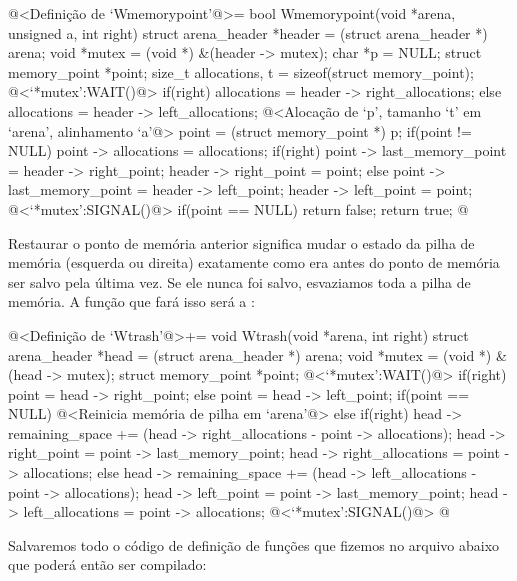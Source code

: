 \iniciocodigo
@<Definição de `Wmemorypoint'@>=
bool Wmemorypoint(void *arena, unsigned a, int right){
  struct arena_header *header = (struct arena_header *) arena;
  void *mutex = (void *) &(header -> mutex);
  char *p = NULL;
  struct memory_point *point;
  size_t allocations, t = sizeof(struct memory_point);
  @<`*mutex':WAIT()@>
  if(right)
    allocations = header -> right_allocations;
  else
    allocations = header -> left_allocations;
  @<Alocação de `p', tamanho `t' em `arena', alinhamento `a'@>
  point = (struct memory_point *) p;
  if(point != NULL){
    point -> allocations = allocations;
    if(right){
      point -> last_memory_point = header -> right_point;
      header -> right_point = point;
    }
    else{
      point -> last_memory_point = header -> left_point;
      header -> left_point = point;
    }
  }
  @<`*mutex':SIGNAL()@>
  if(point == NULL)
    return false;
  return true;
}
@
\fimcodigo


Restaurar o ponto de memória anterior significa mudar o estado da
pilha de memória (esquerda ou direita) exatamente como era antes do
ponto de memória ser salvo pela última vez. Se ele nunca foi salvo,
esvaziamos toda a pilha de memória. A função que fará isso será
a :

\iniciocodigo
@<Definição de `Wtrash'@>+=
void Wtrash(void *arena, int right){
  struct arena_header *head = (struct arena_header *) arena;
  void *mutex = (void *) &(head -> mutex);
  struct memory_point *point;
  @<`*mutex':WAIT()@>
  if(right){
    point = head -> right_point;
  }
  else{
    point = head -> left_point;
  }
  if(point == NULL){
    @<Reinicia memória de pilha em `arena'@>
  }
  else{
    if(right){
      head -> remaining_space += (head -> right_allocations -
                                  point -> allocations);
      head -> right_point = point -> last_memory_point;
      head -> right_allocations = point -> allocations;
    }
    else{
      head -> remaining_space += (head -> left_allocations -
                                  point -> allocations);
      head -> left_point = point -> last_memory_point;
      head -> left_allocations = point -> allocations;
    }
  }
  @<`*mutex':SIGNAL()@>
}
@
\fimcodigo



Salvaremos todo o código de definição de funções que fizemos no
arquivo abaixo que poderá então ser compilado:

